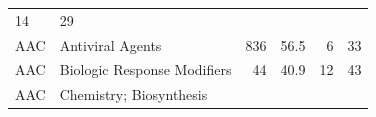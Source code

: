 \documentclass[11pt,]{article}
\begin{document}
\begin{longtable}[]{@{}llrrrr@{}}
\begin{minipage}[t]{0.11\columnwidth}
14\strut
\end{minipage} & \begin{minipage}[t]{0.11\columnwidth}\raggedleft\strut
29\strut
\end{minipage}\tabularnewline
\begin{minipage}[t]{0.06\columnwidth}\raggedright\strut
AAC\strut
\end{minipage} & \begin{minipage}[t]{0.43\columnwidth}\raggedright\strut
Antiviral Agents\strut
\end{minipage} & \begin{minipage}[t]{0.04\columnwidth}\raggedleft\strut
836\strut
\end{minipage} & \begin{minipage}[t]{0.08\columnwidth}\raggedleft\strut
56.5\strut
\end{minipage} & \begin{minipage}[t]{0.11\columnwidth}\raggedleft\strut
6\strut
\end{minipage} & \begin{minipage}[t]{0.11\columnwidth}\raggedleft\strut
33\strut
\end{minipage}\tabularnewline
\begin{minipage}[t]{0.06\columnwidth}\raggedright\strut
AAC\strut
\end{minipage} & \begin{minipage}[t]{0.43\columnwidth}\raggedright\strut
Biologic Response Modifiers\strut
\end{minipage} & \begin{minipage}[t]{0.04\columnwidth}\raggedleft\strut
44\strut
\end{minipage} & \begin{minipage}[t]{0.08\columnwidth}\raggedleft\strut
40.9\strut
\end{minipage} & \begin{minipage}[t]{0.11\columnwidth}\raggedleft\strut
12\strut
\end{minipage} & \begin{minipage}[t]{0.11\columnwidth}\raggedleft\strut
43\strut
\end{minipage}\tabularnewline
\begin{minipage}[t]{0.06\columnwidth}\raggedright\strut
AAC\strut
\end{minipage} & \begin{minipage}[t]{0.43\columnwidth}\raggedright\strut
Chemistry; Biosynthesis\strut
\end{minipage} & \begin{minipage}[t]{0.04\columnwidth}\raggedleft\strut

\end{minipage}
\end{longtable}
\end{document}
